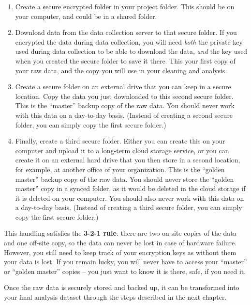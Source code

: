 \begin{enumerate}
	\item Create a secure encrypted folder in your project folder.
  This should be on your computer, and could be in a shared folder.
  
	\item Download data from the data collection server to that secure folder.
	If you encrypted the data during data collection, you will need \textit{both} the
	private key used during data collection to be able to download the data,
	\textit{and} the key used when you created the secure folder to save it there.
	This your first copy of your raw data, and the copy you will use in your cleaning and analysis.
	
	\item Create a secure folder on an external drive that you can keep in a secure location.
	Copy the data you just downloaded to this second secure	folder.
	This is the ``master'' backup copy of the raw data. 
	You should never work with this data on a day-to-day basis.
	(Instead of creating a second secure folder, you can simply copy the first secure folder.)
	
	\item Finally, create a third secure folder.
	Either you can create this on your computer and upload it to a long-term cloud storage service,
	or you can create it on	an external hard drive that you then store in a second location,
	for example, at another office of your organization.
	This is the ``golden master'' backup copy of the raw data.
	You should never store the ``golden master'' copy in a synced folder, 
	as it would be deleted in the cloud storage if it is deleted on your computer.
	You should also never work with this data on a day-to-day basis.
	(Instead of creating a third secure folder, you can simply copy the first secure folder.)
\end{enumerate}

\noindent This handling satisfies the \textbf{3-2-1 rule}:
there are two on-site copies of the data and one off-site copy,
so the data can never be lost in case of hardware failure.
However, you still need to keep track of your encryption keys as without them your data is lost.
If you remain lucky, you will never have to access your ``master'' or ``golden master'' copies --
you just want to know it is there, safe, if you need it.

Once the raw data is securely stored and backed up, 
it can be transformed into your final analysis dataset
through the steps described in the next chapter.
